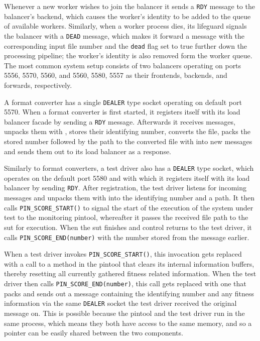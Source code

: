 Whenever a new worker wishes to join the balancer it sends a \texttt{RDY} message to the balancer's backend,
which causes the worker's identity to be added to the queue of available workers. Similarly, when a worker
process dies, its lifeguard signals the balancer with a \texttt{DEAD} message, which makes it forward a
message with the corresponding input file number and the \texttt{dead} flag set to true further down the
processing pipeline; the worker's identity is also removed form the worker queue. The most common system setup
consists of two balancers operating on ports 5556, 5570, 5560, and 5560, 5580, 5557 as their frontends,
backends, and forwards, respectively.

A format converter has a single \texttt{DEALER} type socket operating on default port 5570.
When a format converter is first started, it registers itself with its load balancer facade by sending a
\texttt{RDY} message. Afterwards it receives \zmq messages, unpacks them with \msgpack, stores their
identifying number, converts the file, packs the stored number followed by the path to the converted file with
\msgpack into new \zmq messages and sends them out to its load balancer as a response.

Similarly to format converters, a test driver also has a \texttt{DEALER} type socket, which operates on the
default port 5580 and with which it registers itself with its load balancer by sending \texttt{RDY}. After
registration, the test driver listens for incoming \zmq messages and unpacks them with \msgpack
into the identifying number and a path. It then calls \texttt{PIN\_SCORE\_START()} to signal the start of the
execution of the system under test to the monitoring pintool, whereafter it passes the received file path to
the sut for execution. When the sut finishes and control returns to the test driver, it calls
\texttt{PIN\_SCORE\_END(number)} with the number stored from the message earlier.

When a test driver invokes \texttt{PIN\_SCORE\_START()}, this invocation gets replaced with a call to a method
in the pintool that clears its internal information buffers, thereby resetting all currently gathered fitness
related information. When the test driver then calls \texttt{PIN\_SCORE\_END(number)}, this call gets replaced
with one that packs and sends out a message containing the identifying number and any fitness information via
the same \zmq \texttt{DEALER} socket the test driver received the original message on. This is possible
because the pintool and the test driver run in the same process, which means they both have access to the same
memory, and so a pointer can be easily shared between the two components.

